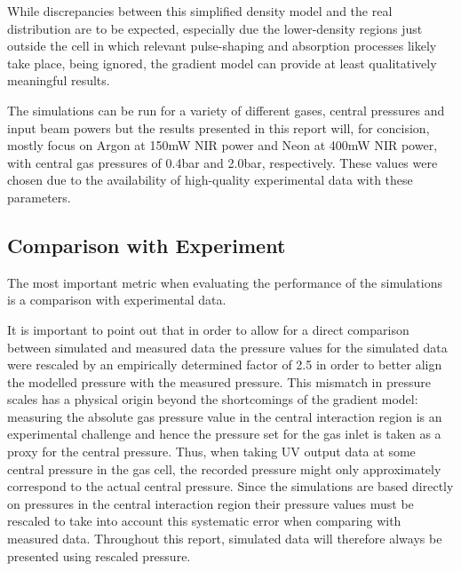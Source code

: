 \documentclass[a4paper]{jpconf}
\begin{document}
While discrepancies between this simplified density model and the real distribution are to be expected, especially due the lower-density regions just outside the cell in which relevant pulse-shaping and absorption processes likely take place, being ignored, the gradient model can provide at least qualitatively meaningful results. \par 
The simulations can be run for a variety of different gases, central pressures and input beam powers but the results presented in this report will, for concision, mostly focus on Argon at 150mW NIR power and Neon at 400mW NIR power, with central gas pressures of 0.4bar and 2.0bar, respectively. These values were chosen due to the availability of high-quality experimental data with these parameters. 

\subsection{Comparison with Experiment}
The most important metric when evaluating the performance of the simulations is a comparison with experimental data. \par 
It is important to point out that in order to allow for a direct comparison between simulated and measured data the pressure values for the simulated data were rescaled by an empirically determined factor of 2.5 in order to better align the modelled pressure with the measured pressure. This mismatch in pressure scales has a physical origin beyond the shortcomings of the gradient model: measuring the absolute gas pressure value in the central interaction region is an experimental challenge and hence the pressure set for the gas inlet is taken as a proxy for the central pressure. Thus, when taking UV output data at some central pressure in the gas cell, the recorded pressure  might only approximately correspond to the actual central pressure. Since the simulations are based directly on pressures in the central interaction region their pressure values must be rescaled to take into account this systematic error when comparing with measured data. Throughout this report, simulated data will therefore always be presented using rescaled pressure. \par 
\end{document}
